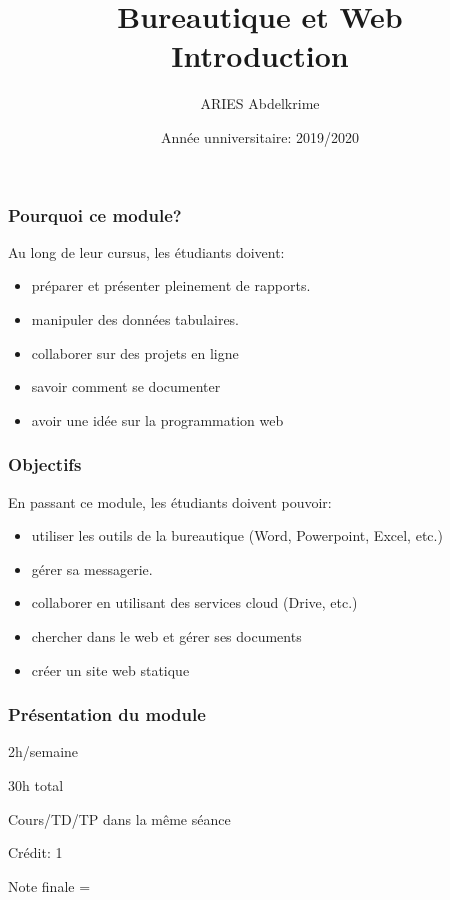 \documentclass{beamer}
\title[BWEB: Introduction] %
{Bureautique et Web \\Introduction}
\institute{ %
École  nationale Supérieure d'Informatique (ESI, ex. INI), Algérie
}
\author[ \textbf{\footnotesize  \insertframenumber/\inserttotalframenumber} \hspace*{1cm} ESI (2019-2020)] %
{ARIES Abdelkrime}
\date{Année unniversitaire: 2019/2020} %
\begin{document}
\begin{frame}[plain]
	\maketitle
\end{frame}

\begin{frame}
\frametitle{Pourquoi ce module?}

Au long de leur cursus, les étudiants doivent:
\begin{itemize}
	\item préparer et présenter pleinement de rapports.
	\item manipuler des données tabulaires.
	\item collaborer sur des projets en ligne
	\item savoir comment se documenter
	\item avoir une idée sur la programmation web
\end{itemize}

\end{frame}


\begin{frame}
	\frametitle{Objectifs}
	En passant ce module, les étudiants doivent pouvoir:
	\begin{itemize}
		\item utiliser les outils de la bureautique (Word, Powerpoint, Excel, etc.)
		\item gérer sa messagerie.
		\item collaborer en utilisant des services cloud (Drive, etc.)
		\item chercher dans le web et gérer ses documents
		\item créer un site web statique
	\end{itemize}

\end{frame}


\begin{frame}
\frametitle{Présentation du module}

2h/semaine 

30h total 

Cours/TD/TP dans la même séance 

Crédit: 1

Note finale = 

\end{frame}
\end{document}
